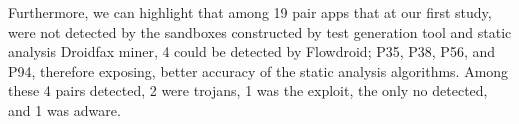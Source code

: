 Furthermore, we can highlight that among 19 pair apps that at our first study, were not detected by the sandboxes constructed by test generation tool and static analysis Droidfax miner, 4 could be detected by Flowdroid; P35, P38, P56, and P94, therefore exposing, better accuracy of the static analysis algorithms. Among these 4 pairs detected, 2 were trojans, 1 was the exploit, the only no detected, and 1 was adware.





